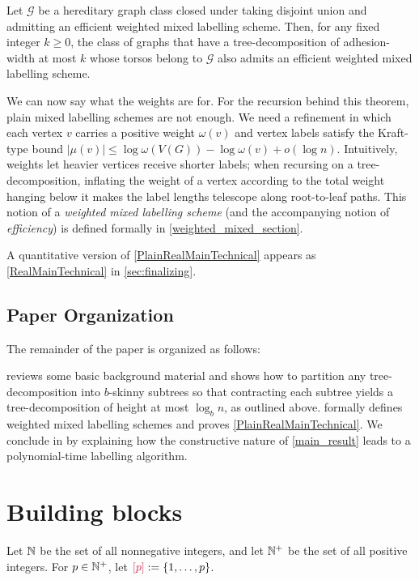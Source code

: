 \documentclass{patmorin}
\makeatletter
\renewcommand{\le}{\leqslant}
\renewcommand{\geq}{\geqslant}
\newcommand{\defin}[1]{\emph{\textcolor{brightmaroon}{#1}}}
\def\mathcolor#1#{\@mathcolor{#1}}
\def\@mathcolor#1#2#3{%
  \protect\leavevmode
  \begingroup
    \color#1{#2}#3%
  \endgroup
}
\newcommand{\mathdefin}[1]{\mathcolor{brightmaroon}{#1}}
\DeclarePairedDelimiter{\set}{\{}{\}}
\makeatother
\begin{document}
\begin{thm}\label{PlainRealMainTechnical}
  Let $\mathcal{G}$ be a hereditary graph class closed under taking disjoint union and admitting an efficient weighted mixed labelling scheme. Then, for any fixed integer $k\geq 0$, the class of graphs that have a tree-decomposition of adhesion-width at most $k$ whose torsos belong to $\mathcal{G}$ also admits an efficient weighted mixed labelling scheme.
\end{thm}

We can now say what the weights are for. For the recursion behind this theorem, plain mixed labelling schemes are not enough. We need a refinement in which each vertex $v$ carries a positive weight $\omega(v)$ and vertex labels satisfy the Kraft-type bound $|\mu(v)|\le\log\omega(V(G))-\log\omega(v)+o(\log n)$. Intuitively, weights let heavier vertices receive shorter labels; when recursing on a tree-decomposition, inflating the weight of a vertex according to the total weight hanging below it makes the label lengths telescope along root-to-leaf paths. This notion of a \defin{weighted mixed labelling scheme} (and the accompanying notion of \emph{efficiency}) is defined formally in \cref{weighted_mixed_section}.


A quantitative version of \cref{PlainRealMainTechnical} appears as \cref{RealMainTechnical} in \cref{sec:finalizing}.

\subsection{Paper Organization}

The remainder of the paper is organized as follows:  

 reviews some basic background material and shows how to
partition any tree-decomposition into $b$-skinny subtrees so that contracting
each subtree yields a tree-decomposition of height at most $\log_b n$, as outlined above.     formally defines weighted mixed labelling schemes and proves \cref{PlainRealMainTechnical}.
We conclude in  by explaining how the constructive nature of \cref{main_result} leads to a
polynomial-time labelling algorithm.

\section{Building blocks}\label{building_blocks}

Let \defin{$\mathbb{N}$} be the set of all nonnegative integers, and let \defin{$\mathbb{N}^+$} be the set of all positive integers.  For $p\in\mathbb{N}^+$, let $\mathdefin{[p]} := \set{1,\dots,p}$. 
\end{document}
